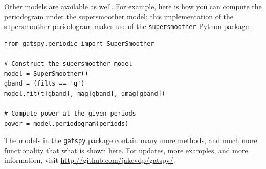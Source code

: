 \documentclass[12pt,preprint]{aastex}
\begin{document}
Other models are available as well. For example, here is how you can compute the periodogram under the supersmoother model; this implementation of the supersmoother periodogram makes use of the \texttt{supersmoother} Python package \citep{Vanderplas2015}.

\begin{lstlisting}
from gatspy.periodic import SuperSmoother

# Construct the supersmoother model
model = SuperSmoother()
gband = (filts == 'g')
model.fit(t[gband], mag[gband], dmag[gband])

# Compute power at the given periods
power = model.periodogram(periods)
\end{lstlisting}

The models in the \texttt{gatspy} package contain many more methods, and much more functionality that what is shown here. For updates, more examples, and more information, visit \url{http://github.com/jakevdp/gatspy/}.
\end{document}
